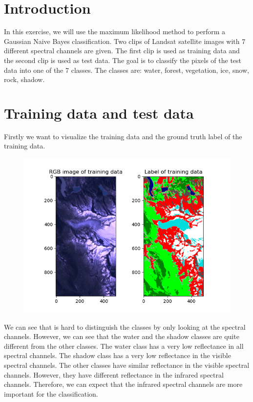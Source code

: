 \documentclass[12pt
,headinclude
,headsepline
,bibtotocnumbered
]{scrartcl}
\begin{document}
\section*{Introduction}
In this exercise, we will use the maximum likelihood method to perform a Gaussian Naive Bayes classification. Two clips of Landsat satellite images with 7 different spectral channels are given. The first clip is used as training data and the second clip is used as test data. The goal is to classify the pixels of the test data into one of the 7 classes. The classes are: water, forest, vegetation, ice, snow, rock, shadow. 
\section*{Training data and test data}
Firstly we want to visualize the training data and the ground truth label of the training data.
\begin{figure}[H]
\centering
\includegraphics[width=1\textwidth]{plots/train.png}
\end{figure}
We can see that is hard to distinguish the classes by only looking at the spectral channels. However, we can see that the water and the shadow classes are quite different from the other classes. The water class has a very low reflectance in all spectral channels. The shadow class has a very low reflectance in the visible spectral channels. The other classes have similar reflectance in the visible spectral channels. However, they have different reflectance in the infrared spectral channels. Therefore, we can expect that the infrared spectral channels are more important for the classification.
\end{document}
